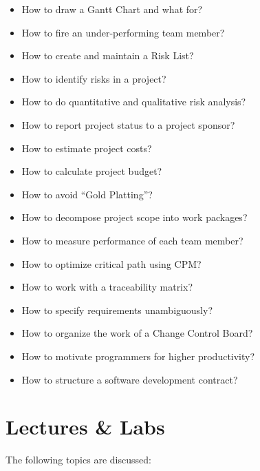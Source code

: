 \documentclass[nobrand,anonymous,nodate,nosecurity]{huawei}
\begin{document}
{\begin{itemize}
\item How to draw a Gantt Chart and what for?
\item How to fire an under-performing team member?
\item How to create and maintain a Risk List?
\item How to identify risks in a project?
\item How to do quantitative and qualitative risk analysis?
\item How to report project status to a project sponsor?
\item How to estimate project costs?
\item How to calculate project budget?
\item How to avoid ``Gold Platting''?
\item How to decompose project scope into work packages?
\item How to measure performance of each team member?
\item How to optimize critical path using CPM?
\item How to work with a traceability matrix?
\item How to specify requirements unambiguously?
\item How to organize the work of a Change Control Board?
\item How to motivate programmers for higher productivity?
\item How to structure a software development contract?
\end{itemize}

\newpage
\section*{Lectures \& Labs}

The following topics are discussed:

}
\end{document}
